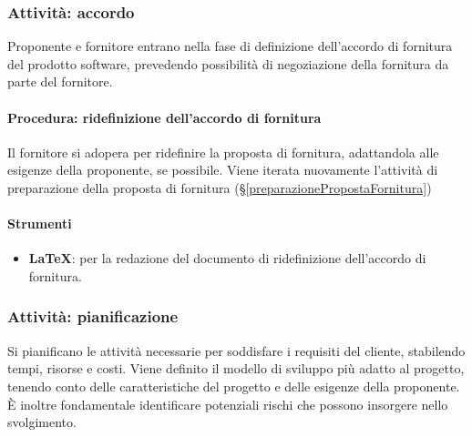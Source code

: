 \documentclass[a4paper,12pt]{article}
\begin{document}
\subsubsection{Attività: accordo}
Proponente e fornitore entrano nella fase di definizione dell'accordo di
fornitura del prodotto software, prevedendo possibilità di negoziazione della
fornitura da parte del fornitore.

\paragraph{Procedura: ridefinizione dell'accordo di fornitura}
Il fornitore si adopera per ridefinire la proposta di fornitura, adattandola
alle esigenze della proponente, se possibile. Viene iterata nuovamente
l'attività di preparazione della proposta di fornitura
(§\ref{preparazionePropostaFornitura})

\paragraph{Strumenti}
\begin{itemize}
    \item \textbf{\LaTeX}: per la redazione del documento di ridefinizione dell'accordo di fornitura.
\end{itemize}

\subsubsection{Attività: pianificazione}
Si pianificano le attività necessarie per soddisfare i requisiti del cliente,
stabilendo tempi, risorse e costi. Viene definito il modello di sviluppo più
adatto al progetto, tenendo conto delle caratteristiche del progetto e delle
esigenze della proponente. È inoltre fondamentale identificare potenziali
rischi che possono insorgere nello svolgimento.
\end{document}
